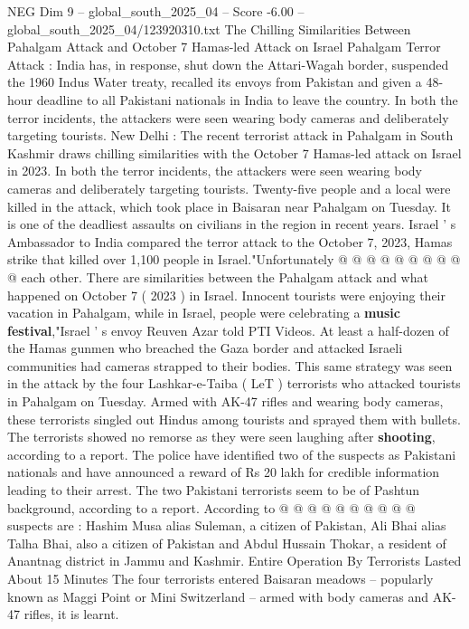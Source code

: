 \begin{textsample}{NEG Dim 9 – global\_south\_2025\_04 – Score -6.00 – global\_south\_2025\_04/123920310.txt}  \label{ex:f9_neg_292}
The Chilling Similarities Between Pahalgam Attack and October 7 Hamas-led Attack on Israel Pahalgam Terror Attack : India has, in response, shut down the Attari-Wagah border, suspended the 1960 Indus Water treaty, recalled its envoys from Pakistan and given a 48-hour deadline to all Pakistani nationals in India to leave the country.
In both the terror incidents, the attackers were seen wearing body cameras and deliberately targeting tourists.
New Delhi : The recent terrorist attack in Pahalgam in South Kashmir draws chilling similarities with the October 7 Hamas-led attack on Israel in 2023.
In both the terror incidents, the attackers were seen wearing body cameras and deliberately targeting tourists.
Twenty-five people and a local were killed in the attack, which took place in Baisaran near Pahalgam on Tuesday.
It is one of the deadliest assaults on civilians in the region in recent years.
Israel ' s Ambassador to India compared the terror attack to the October 7, 2023, Hamas strike that killed over 1,100 people in Israel."Unfortunately @ @ @ @ @ @ @ @ @ @ each other.
There are similarities between the Pahalgam attack and what happened on October 7 ( 2023 ) in Israel.
Innocent tourists were enjoying their vacation in Pahalgam, while in Israel, people were celebrating a \textbf{music} \textbf{festival},"Israel ' s envoy Reuven Azar told PTI Videos.
At least a half-dozen of the Hamas gunmen who breached the Gaza border and attacked Israeli communities had cameras strapped to their bodies.
This same strategy was seen in the attack by the four Lashkar-e-Taiba ( LeT ) terrorists who attacked tourists in Pahalgam on Tuesday.
Armed with AK-47 rifles and wearing body cameras, these terrorists singled out Hindus among tourists and sprayed them with bullets.
The terrorists showed no remorse as they were seen laughing after \textbf{shooting}, according to a report.
The police have identified two of the suspects as Pakistani nationals and have announced a reward of Rs 20 lakh for credible information leading to their arrest.
The two Pakistani terrorists seem to be of Pashtun background, according to a report.
According to @ @ @ @ @ @ @ @ @ @ suspects are : Hashim Musa alias Suleman, a citizen of Pakistan, Ali Bhai alias Talha Bhai, also a citizen of Pakistan and Abdul Hussain Thokar, a resident of Anantnag district in Jammu and Kashmir.
Entire Operation By Terrorists Lasted About 15 Minutes The four terrorists entered Baisaran meadows -- popularly known as Maggi Point or Mini Switzerland -- armed with body cameras and AK-47 rifles, it is learnt.

\end{textsample}
